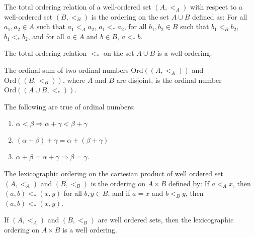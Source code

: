         \begin{definition}
           The total ordering relation of a
           well-ordered set $(A,<_{A})$ with respect
           to a well-ordered set $(B,<_{B})$ is the ordering
           on the set ${A}\cup{B}$ defined as: For all
           $a_{1},a_{2}\in{A}$ such that $a_{1}<_{A}a_{2}$,
           $a_{1}<_{*}a_{2}$, for all $b_{1},b_{2}\in{B}$
           such that $b_{1}<_{B}b_{2}$, $b_{1}<_{*}b_{2}$,
           and for all ${a}\in{A}$ and ${b}\in{B}$,
           ${a}<_{*}{b}$.
        \end{definition}
        \begin{theorem}
           The total ordering relation $<_{*}$ on the set
           ${A}\cup{B}$ is a well-ordering.
        \end{theorem}
        \begin{definition}
           The ordinal sum of two ordinal numbers
           $\mathrm{Ord}((A,<_{A}))$ and $\mathrm{Ord}((B,<_{B}))$,
           where $A$ and $B$ are disjoint,
           is the ordinal number
           $\mathrm{Ord}(({A}\cup{B},<_{*}))$.
        \end{definition}
        \begin{theorem}
           The following are true of ordinal numbers:
           \begin{enumerate}
                \item $\alpha<\beta\Rightarrow%
                       \alpha+\gamma<\beta+\gamma$
                \item $(\alpha+\beta)+\gamma%
                       =\alpha+(\beta+\gamma)$
                \item $\alpha+\beta=\alpha+\gamma%
                       \Rightarrow\beta=\gamma$.
           \end{enumerate}
        \end{theorem}
        \begin{definition}
           The lexicographic ordering on the cartesian
           product of well ordered set $(A,<_{A})$ and
           $(B,<_{B})$ is the ordering on
           ${A}\times{B}$ defined by: If ${a}<_{A}{x}$,
           then $(a,b)<_{*}(x,y)$ for all $b,y\in{B}$, and
           if $a=x$ and $b<_{B}y$, then $(a,b)<_{*}(x,y)$.
        \end{definition}
        \begin{theorem}
           If $(A,<_{A})$ and $(B,<_{B})$ are well ordered
           sets, then the lexicographic ordering
           on ${A}\times{B}$ is a well ordering.
        \end{theorem}
